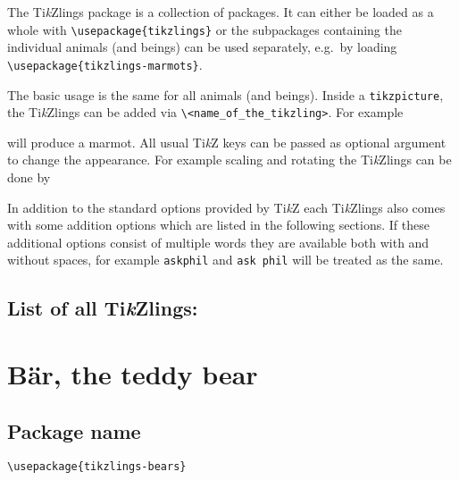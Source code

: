 \documentclass[parskip=half]{scrartcl}
\newcommand{\TikZ}{Ti\emph{k}Z\xspace}
\newcommand{\tikzlings}{Ti\emph{k}Zlings\xspace}
\begin{document}
The \tikzlings package is a collection of packages. It can either be loaded as a whole with \lstinline|\usepackage{tikzlings}| or the subpackages containing the individual animals (and beings) can be used separately, e.g.\ by loading \lstinline|\usepackage{tikzlings-marmots}|.

The basic usage is the same for all animals (and beings). Inside a \lstinline|tikzpicture|, the \tikzlings can be added via \color{SteelBlue!50!black}\lstinline|\<name_of_the_tikzling>|\color{black}. For example

\begin{tcblisting}{}
\marmot
\end{tcblisting}

will produce a marmot. All usual \TikZ keys can be passed as optional argument to change the appearance. For example scaling and rotating the \tikzlings can be done by

\begin{tcblisting}{}
\coati[rotate=30,scale=0.5]
\end{tcblisting}

In addition to the standard options provided by \TikZ each \tikzlings also comes with some addition options which are listed in the following sections. If these additional options consist of multiple words they are available both with and without spaces, for example \lstinline|askphil| and \lstinline|ask phil| will be treated as the same.

\subsection*{List of all \tikzlings:}

\begingroup
	\hypersetup{hidelinks}
	\tableofcontents
\endgroup


\clearpage
\section[Bear]{B\"ar, the teddy bear}

\subsection{Package name}

\begin{tcolorbox}[lower separated=false, lefthand width=.8\linewidth]
\vspace*{0.5cm}
\lstinline|\usepackage{tikzlings-bears}|
\vspace*{0.5cm}
\end{tcolorbox}
\end{document}
